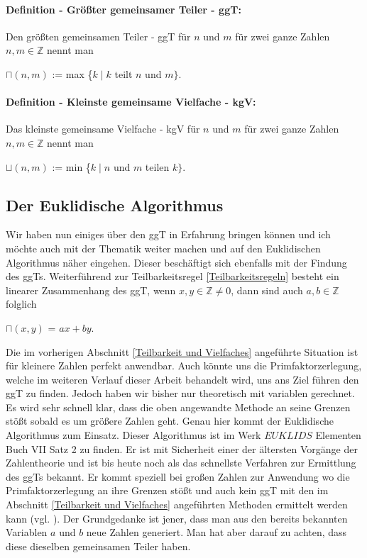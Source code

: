 \documentclass[12pt,a4paper]{article}
\theoremstyle{definition}
\begin{document}
\paragraph{Definition - Größter gemeinsamer Teiler - ggT:}
Den größten gemeinsamen Teiler - ggT für $n$ und $m$ für zwei ganze Zahlen $n, m\in \mathbb{Z}$ nennt man
\begin{center}
$\sqcap(n, m)$ := max \{$k \mid k$ teilt $n$ und $m\}$.
\end{center}
\paragraph{Definition - Kleinste gemeinsame Vielfache - kgV:}
Das kleinste gemeinsame Vielfache - kgV für $n$ und $m$ für zwei ganze Zahlen $n, m\in \mathbb{Z}$ nennt man
\begin{center}
$\sqcup(n, m)$ := min \{$k \mid n$ und $m$ teilen $k\}$.
\end{center}

\newpage
\subsection{Der Euklidische Algorithmus}\label{Der Euklidische Algorithmus}
Wir haben nun einiges über den ggT in Erfahrung bringen können und ich möchte auch mit der Thematik weiter machen und auf den Euklidischen Algorithmus näher eingehen.
Dieser beschäftigt sich ebenfalls mit der Findung des ggTs.\newline
Weiterführend zur Teilbarkeitsregel \ref{Teilbarkeitsregeln} besteht ein linearer Zusammenhang des ggT, wenn $x, y \in \mathbb{Z} \neq 0$, dann sind auch $a, b \in \mathbb{Z}$ folglich
\begin{center}
$\sqcap(x, y)$ = $ax + by$.
\end{center}
Die im vorherigen Abschnitt \ref{Teilbarkeit und Vielfaches} angeführte Situation ist für kleinere Zahlen perfekt anwendbar.
Auch könnte uns die Primfaktorzerlegung, welche im weiteren Verlauf dieser Arbeit behandelt wird, uns ans Ziel führen den ggT zu finden.
Jedoch haben wir bisher nur theoretisch mit variablen gerechnet.
Es wird sehr schnell klar, dass die oben angewandte Methode an seine Grenzen stößt sobald es um größere Zahlen geht.
Genau hier kommt der Euklidische Algorithmus zum Einsatz.
Dieser Algorithmus ist im Werk $EUKLIDS$ Elementen Buch VII Satz 2 zu finden.
Er ist mit Sicherheit einer der ältersten Vorgänge der Zahlentheorie und ist bis heute noch als das schnellste Verfahren zur Ermittlung des ggTs bekannt.
Er kommt speziell bei großen Zahlen zur Anwendung wo die Primfaktorzerlegung an ihre Grenzen stößt und auch kein ggT mit den im Abschnitt \ref{Teilbarkeit und Vielfaches} angeführten Methoden ermittelt werden kann (vgl. \cite[83--84]{Crandall2005}).\newline
Der Grundgedanke ist jener, dass man aus den bereits bekannten Variablen $a$ und $b$ neue Zahlen generiert.
Man hat aber darauf zu achten, dass diese dieselben gemeinsamen Teiler haben.
\end{document}
